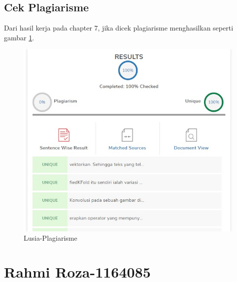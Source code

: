\subsection{Cek Plagiarisme}
\par Dari hasil kerja pada chapter 7, jika dicek plagiarisme menghasilkan seperti gambar \ref{7D1}.
		\begin{figure}[!hbtp]
		\centering
		\includegraphics[scale=0.4]{figures/pc7.jpg}
		\caption{Lusia-Plagiarisme}
		\label{7D1}
		\end{figure}




\section{Rahmi Roza-1164085}
